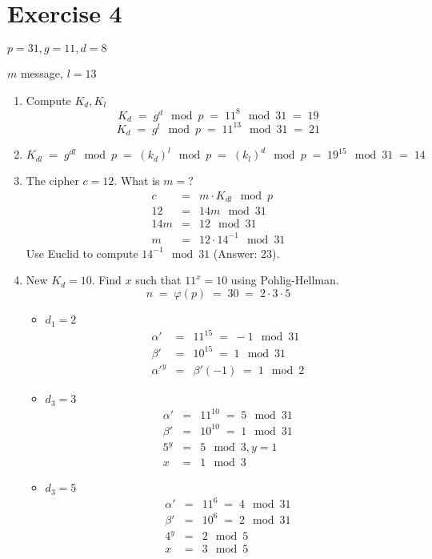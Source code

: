 \documentclass[a4paper]{scrreprt}
\begin{document}
\section*{Exercise 4}

$p=31, g=11, d=8$

$m$ message, $l=13$

\begin{enumerate}
    \item Compute $K_d, K_l$
        \[K_d \;=\; g^d\mod p \;=\; 11^8\mod31 \;=\; 19\]
        \[K_d \;=\; g^l\mod p \;=\; 11^{13}\mod31 \;=\; 21\]
    \item 
        \[K_{dl} \;=\; g^{dl}\mod p \;=\; (k_d)^l\mod p
            \;=\; (k_l)^d\mod p \;=\; 19^{15}\mod 31\;=\;14\]
    \item The cipher $c=12$. What is $m=?$
        \begin{eqnarray*}
            c &=& m\cdot K_{dl}\mod p\\
            12 &=& 14m\mod31\\
            14m &=& 12 \mod31\\
            m &=& 12\cdot 14^{-1}\mod 31
        \end{eqnarray*}
        Use Euclid to compute $14^{-1}\mod31$ (Answer: 23).
    \item New $K_d=10$. Find $x$ such that $11^x=10$ using Pohlig-Hellman.
        \[ n \;=\; \varphi(p) \;=\; 30\;=\;2\cdot3\cdot5 \]
        \begin{itemize}
            \item $d_1=2$
                \begin{eqnarray*}
                    \alpha'&=&11^{15}\;=\;-1\mod 31\\
                    \beta'&=&10^{15}\;=\;1\mod 31\\
                    \alpha'^y &=& \beta'(-1)\;=\;1\mod 2
                \end{eqnarray*}
            \item $d_3=3$
                \begin{eqnarray*}
                    \alpha'&=&11^{10}\;=\;5\mod 31\\
                    \beta'&=&10^{10}\;=\;1\mod 31\\
                    5^y &=& 5\mod 3, y=1\\
                    x &=& 1\mod 3
                \end{eqnarray*}
            \item $d_3=5$
                \begin{eqnarray*}
                    \alpha'&=&11^{6}\;=\;4\mod 31\\
                    \beta'&=&10^{6}\;=\;2\mod 31\\
                    4^y&=&2\mod 5\\
                    x&=& 3\mod 5
                \end{eqnarray*}
        \end{itemize}
\end{enumerate}
\end{document}

